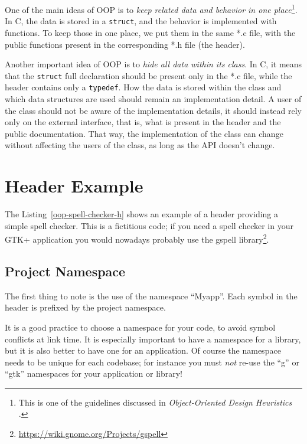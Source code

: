 One of the main ideas of OOP is to \emph{keep related data and behavior in one place}\footnote{This is one of the guidelines discussed in \emph{Object-Oriented Design Heuristics} \cite{oop-book}.}. In C, the data is stored in a \lstinline{struct}, and the behavior is implemented with functions. To keep those in one place, we put them in the same *.c file, with the public functions present in the corresponding *.h file (the header).

Another important idea of OOP is to \emph{hide all data within its class}. In C, it means that the \lstinline{struct} full declaration should be present only in the *.c file, while the header contains only a \lstinline{typedef}. How the data is stored within the class and which data structures are used should remain an implementation detail. A user of the class should not be aware of the implementation details, it should instead rely only on the external interface, that is, what is present in the header and the public documentation. That way, the implementation of the class can change without affecting the users of the class, as long as the API doesn't change.

\section{Header Example}

The Listing~\ref{oop-spell-checker-h} shows an example of a header providing a simple spell checker. This is a fictitious code; if you need a spell checker in your GTK+ application you would nowadays probably use the gspell library\footnote{\url{https://wiki.gnome.org/Projects/gspell}}.

\vspace{0.7cm}


\subsection{Project Namespace}
The first thing to note is the use of the namespace ``Myapp''. Each symbol in the header is prefixed by the project namespace.

It is a good practice to choose a namespace for your code, to avoid symbol conflicts at link time. It is especially important to have a namespace for a library, but it is also better to have one for an application. Of course the namespace needs to be unique for each codebase; for instance you must \emph{not} re-use the ``g'' or ``gtk'' namespaces for your application or library!

